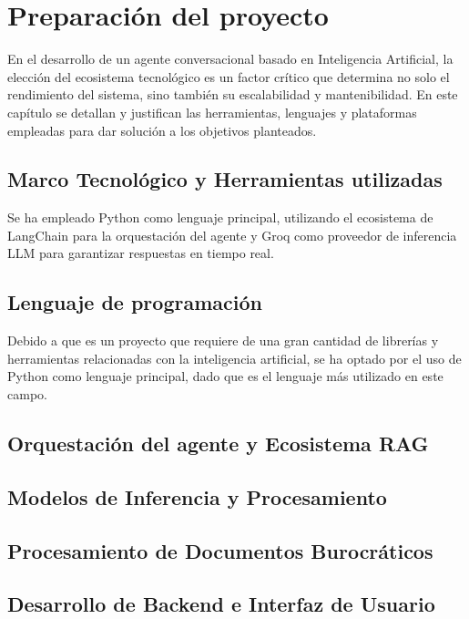 \documentclass[12pt,a4paper,oneside]{report}
\begin{document}
\chapter{Preparación del proyecto}

En el desarrollo de un agente conversacional basado en Inteligencia Artificial, la elección del ecosistema tecnológico es un factor crítico que determina no solo el rendimiento del sistema, sino también su escalabilidad y mantenibilidad. En este capítulo se detallan y justifican las herramientas, lenguajes y plataformas empleadas para dar solución a los objetivos planteados.

\section{Marco Tecnológico y Herramientas utilizadas}
Se ha empleado Python como lenguaje principal, utilizando el ecosistema de LangChain para la orquestación del agente y Groq como proveedor de inferencia LLM para garantizar respuestas en tiempo real.

\section{Lenguaje de programación}

Debido a que es un proyecto que requiere de una gran cantidad de librerías y herramientas relacionadas con la inteligencia artificial, se ha optado por el uso de Python como lenguaje principal, dado que es el lenguaje más utilizado en este campo.

\section{Orquestación del agente y Ecosistema RAG}



\section{Modelos de Inferencia y Procesamiento}

\section{Procesamiento de Documentos Burocráticos}

\section{Desarrollo de Backend e Interfaz de Usuario}
\end{document}
